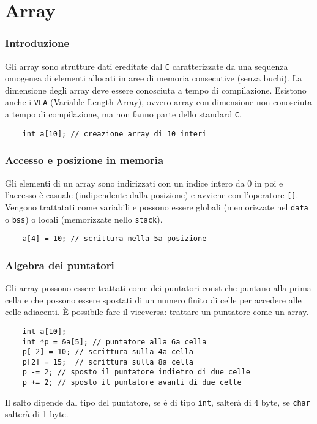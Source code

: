 \documentclass[a4paper]{article}
\begin{document}
\newpage

\section{Array}
\subsubsection*{Introduzione}
Gli array sono strutture dati ereditate dal \verb|C| caratterizzate da una sequenza omogenea di elementi allocati in aree di
memoria consecutive (senza buchi). La dimensione degli array deve essere conosciuta a tempo di compilazione. Esistono anche
i \verb|VLA| (Variable Length Array), ovvero array con dimensione non conosciuta a tempo di compilazione, ma non fanno parte
dello standard \verb|C|.
\begin{lstlisting}
	int a[10]; // creazione array di 10 interi
\end{lstlisting}

\subsubsection*{Accesso e posizione in memoria}
Gli elementi di un array sono indirizzati con un indice intero da 0 in poi e l'accesso è casuale (indipendente dalla posizione)
e avviene con l'operatore \verb|[]|. Vengono trattatati come variabili e possono essere globali (memorizzate nel \verb|data| o
\verb|bss|) o locali (memorizzate nello \verb|stack|).
\begin{lstlisting}
	a[4] = 10; // scrittura nella 5a posizione
\end{lstlisting}

\subsubsection*{Algebra dei puntatori}
Gli array possono essere trattati come dei puntatori const che puntano alla prima cella e che possono essere spostati di un
numero finito di celle per accedere alle celle adiacenti. È possibile fare il viceversa: trattare un puntatore come un array.
\begin{lstlisting}
	int a[10];
	int *p = &a[5]; // puntatore alla 6a cella
	p[-2] = 10; // scrittura sulla 4a cella
	p[2] = 15;  // scrittura sulla 8a cella
	p -= 2; // sposto il puntatore indietro di due celle
	p += 2; // sposto il puntatore avanti di due celle 
\end{lstlisting}
Il salto dipende dal tipo del puntatore, se è di tipo \verb|int|, salterà di 4 byte, se \verb|char| salterà di 1 byte.
\end{document}
